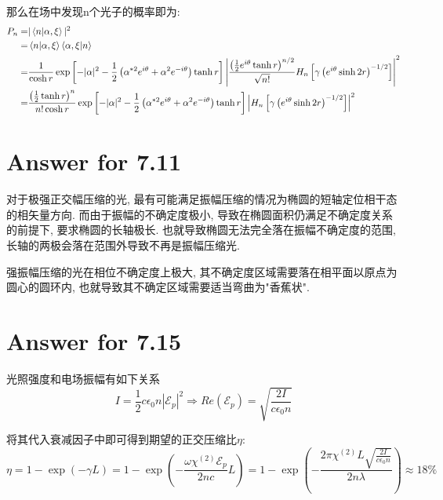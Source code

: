 \documentclass[twoside]{article}
\begin{document}
那么在场中发现n个光子的概率即为:
\begin{equation*}
    \begin{split}
        P_n = & |\braket{n|\alpha, \xi}|^2                                                                                                                                         \\
        =     & \braket{n|\alpha, \xi} \braket{\alpha, \xi | n}                                                                                                                    \\
        =     & \frac{1}{\cosh r} \exp\left[- |\alpha|^2 - \frac{1}{2}\left(\alpha^{*2}e^{i\theta} + \alpha^2 e^{-i\theta}\right)\tanh r\right]
        \left| \frac{\left(\frac{1}{2}e^{i\theta} \tanh r \right)^{n/2}}{\sqrt{n!}} H_n \left[\gamma\left(e^{i\theta}\sinh 2r\right)^{-1/2}\right]\right|^2                        \\
        =     & \frac{\left(\frac{1}{2}\tanh r\right)^n}{n! \cosh r} \exp\left[- |\alpha|^2 - \frac{1}{2}\left(\alpha^{*2}e^{i\theta} + \alpha^2 e^{-i\theta}\right)\tanh r\right]
        \left| H_n \left[\gamma\left(e^{i\theta}\sinh 2r\right)^{-1/2}\right]\right|^2                                                                                             \\
    \end{split}
\end{equation*}


\section*{Answer for 7.11}

对于极强正交幅压缩的光, 最有可能满足振幅压缩的情况为椭圆的短轴定位相干态的相矢量方向.
而由于振幅的不确定度极小, 导致在椭圆面积仍满足不确定度关系的前提下, 要求椭圆的长轴极长.
也就导致椭圆无法完全落在振幅不确定度的范围, 长轴的两极会落在范围外导致不再是振幅压缩光.

强振幅压缩的光在相位不确定度上极大, 其不确定度区域需要落在相平面以原点为圆心的圆环内,
也就导致其不确定区域需要适当弯曲为"香蕉状".

\section*{Answer for 7.15}

光照强度和电场振幅有如下关系
\begin{equation*}
    I = \frac{1}{2} c \epsilon_0 n |\mathcal{E}_p|^2  \Rightarrow Re(\mathcal{E}_p) = \sqrt{\frac{2I}{c \epsilon_0 n}}
\end{equation*}

将其代入衰减因子中即可得到期望的正交压缩比$\eta$:
\begin{equation*}
    \eta = 1 - \exp(-\gamma L) = 1 - \exp\left(-\frac{\omega \chi^{(2)} \mathcal{E}_p }{2 n c} L\right) = 1 - \exp \left(- \frac{2 \pi \chi^{(2)} L \sqrt{\frac{2 I }{c \epsilon_0 n}}}{2 n \lambda}\right) \approx 18\%
\end{equation*}
\end{document}

